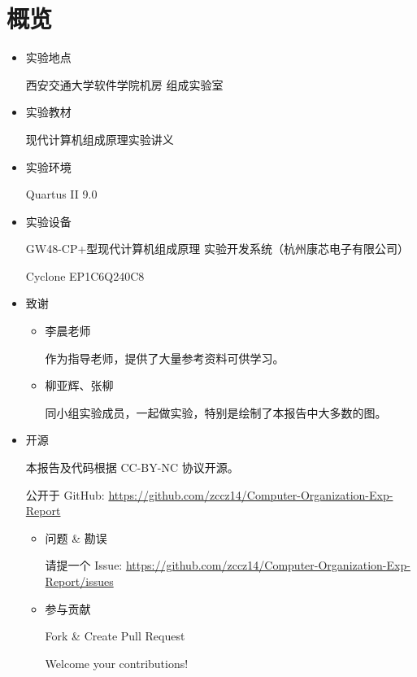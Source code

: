 \chapter*{概览}

\begin{itemize}
    \item 实验地点
    
    西安交通大学软件学院机房 组成实验室
    
    \item 实验教材
    
    现代计算机组成原理实验讲义
    
    \item 实验环境
    
    Quartus II 9.0
    
    \item 实验设备
    
    GW48-CP+型现代计算机组成原理 实验开发系统（杭州康芯电子有限公司）
    
    Cyclone EP1C6Q240C8
    
    \item 致谢
    
    \begin{itemize}
        \item 李晨老师
        
        作为指导老师，提供了大量参考资料可供学习。
        
        \item 柳亚辉、张柳
        
        同小组实验成员，一起做实验，特别是绘制了本报告中大多数的图。
        
    \end{itemize}
    
    \item{开源}
    
    本报告及代码根据 CC-BY-NC 协议开源。
    
    公开于 GitHub: \href{https://github.com/zccz14/Computer-Organization-Exp-Report}{https://github.com/zccz14/Computer-Organization-Exp-Report}
    
    \begin{itemize}
        \item 问题 \& 勘误
        
        请提一个 Issue: \href{https://github.com/zccz14/Computer-Organization-Exp-Report/issues}{https://github.com/zccz14/Computer-Organization-Exp-Report/issues}
        
        \item 参与贡献
        
        Fork \& Create Pull Request
        
        Welcome your contributions!
        
    \end{itemize}
    
\end{itemize}
